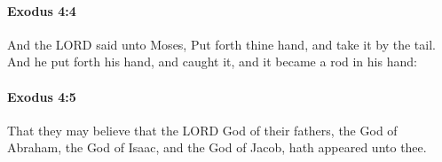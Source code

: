 		\paragraph{Exodus 4:4} %
			\label{EXODUS-4-4}

			And the LORD said unto Moses, Put forth thine hand, and take it by the tail. And he put forth his hand, and caught it, and it became a rod in his hand:


		\paragraph{Exodus 4:5} %
			\label{EXODUS-4-5}

			That they may believe that the LORD God of their fathers, the God of Abraham, the God of Isaac, and the God of Jacob, hath appeared unto thee.


